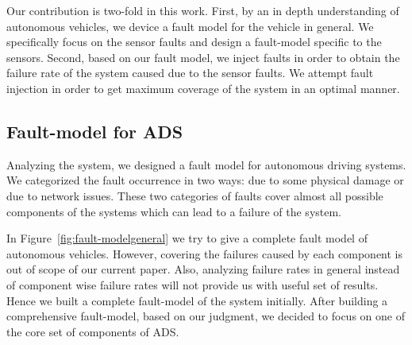

Our contribution is two-fold in this work. First, by an in depth understanding of autonomous vehicles, we device a fault model for the vehicle in general. We specifically focus on the sensor faults and design a fault-model specific to the sensors. Second, based on our fault model, we inject faults in order to obtain the failure rate of the system caused due to the sensor faults. We attempt fault injection in order to get maximum coverage of the system in an optimal manner.

\subsection{Fault-model for ADS}
Analyzing the system, we designed a fault model for autonomous driving systems. We categorized the fault occurrence in two ways: due to some physical damage or due to network issues. These two categories of faults cover almost all possible components of the systems which can lead to a failure of the system. 







In Figure~\ref{fig:fault-modelgeneral} we try to give a complete fault model of autonomous vehicles. However, covering the failures caused by each component is out of scope of our current paper. Also, analyzing failure rates in general instead of component wise failure rates will not provide us with useful set of results. Hence we built a complete fault-model of the system initially. After building a comprehensive fault-model, based on our judgment, we decided to focus on one of the core set of components of ADS.

